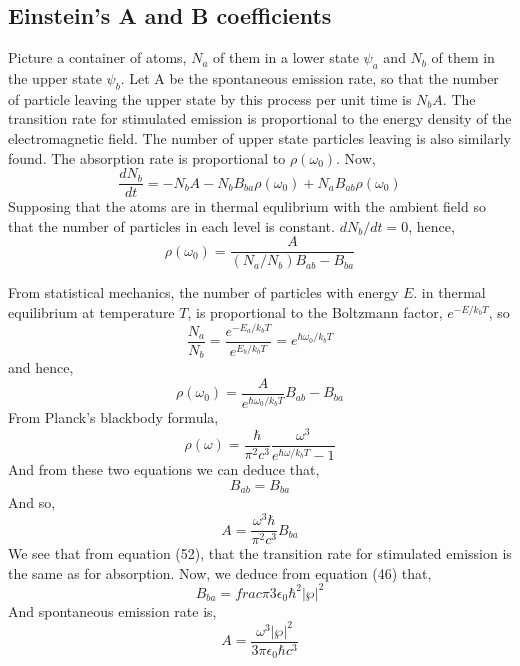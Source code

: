 \subsection{Einstein's A and B coefficients}
Picture a container of atoms, $N_a$ of them in a lower state $\psi_a$ and $N_b$ of them in the upper state $\psi_b$. Let A be the spontaneous emission rate, so that the number of particle leaving the upper state by this process per unit time is $N_bA$. The transition rate for stimulated emission is proportional to the energy density of the electromagnetic field. The number of upper state particles leaving is also similarly found. The absorption rate is proportional to $\rho(\omega_0)$. Now,
\begin{equation}
	\frac{dN_b}{dt}=-N_bA-N_bB_{ba}\rho(\omega_0)+N_aB_{ab}\rho(\omega_0)
\end{equation}
Supposing that the atoms are in thermal equlibrium with the ambient field so that the number of particles in each level is constant. $dN_b/dt=0$, hence,
\begin{equation}
	\rho(\omega_0)=\frac{A}{(N_a/N_b)B_{ab}-B_{ba}}
\end{equation}

From statistical mechanics, the number of particles with energy $E$. in thermal equilibrium at temperature $T$, is proportional to the Boltzmann factor, $e^{-E/k_bT}$, so
\begin{equation}
	\frac{N_a}{N_b}=\frac{e^{-E_a/k_bT}}{e^{E_b/k_bT}}=e^{\hbar\omega_0/k_bT}
\end{equation}
and hence,
\begin{equation}
	\rho(\omega_0)=\frac{A}{e^{\hbar\omega_0/k_bT}}B_{ab}-B_{ba}
\end{equation}
From Planck's blackbody formula,
\begin{equation}
	\rho(\omega)=\frac{\hbar}{\pi^2c^3}\frac{\omega^3}{e^{\hbar\omega/k_bT}-1}
\end{equation}
And from these two equations we can deduce that,
\begin{equation}
	B_{ab}=B_{ba}
\end{equation}
And so,
\begin{equation}
	A=\frac{\omega^3\hbar}{\pi^2c^3}B_{ba}
\end{equation}
We see that from equation (52), that the transition rate for stimulated emission is the same as for absorption. Now, we deduce from equation (46) that,
\begin{equation}
	B_{ba}= frac{\pi}{3\epsilon_0\hbar^2}|\bm{\wp}|^2
\end{equation}
And spontaneous emission rate is,
\begin{equation}
	A=\frac{\omega^3|\bm{\wp}|^2}{3\pi\epsilon_0\hbar c^3}
\end{equation}

